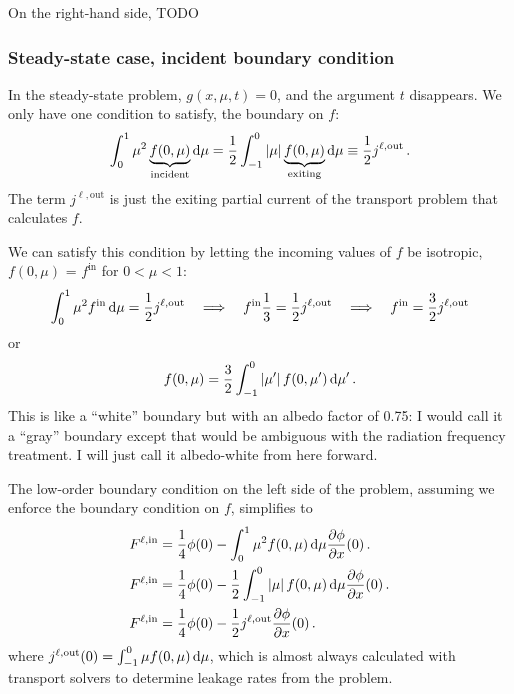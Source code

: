 On the right-hand side, TODO

\subsubsection{Steady-state case, incident boundary condition}
In the steady-state problem, $g(x, \mu, t)=0$, and the argument $t$
disappears.
We only have one condition to satisfy, the boundary on $f$:
\begin{equation*}
  \int_{0}^{1} \mu^2 \underbrace{f(0, \mu)}_{\text{incident}} \mathop{}\!\mathrm{d}\mu
  = \frac{1}{2} \int_{-1}^{0} \left| \mu \right| 
  \underbrace{f(0, \mu) }_{\text{exiting}} \mathop{}\!\mathrm{d}\mu
  \equiv \frac{1}{2} j^{\ell,\mathrm{out}}\,.
\end{equation*}
The term $j^{\ell,\mathrm{out}}$ is just the exiting partial current of the
transport problem that calculates $f$.

We can satisfy this condition by letting the incoming values of $f$ be
isotropic, $f(0, \mu)$ = $f^\mathrm{in}$ for $0 < \mu < 1$:
\begin{align*}
  \int_{0}^{1} \mu^2 f^\mathrm{in}\mathop{}\!\mathrm{d} \mu
  = \frac{1}{2} j^{\ell,\mathrm{out}}
  \quad \Longrightarrow \quad
  f^\mathrm{in} \frac{1}{3}
  = \frac{1}{2} j^{\ell,\mathrm{out}}
  \quad \Longrightarrow \quad
  f^\mathrm{in} = \frac{3}{2} j^{\ell,\mathrm{out}}
\end{align*}
or
\begin{equation} \label{eq:bndyFOnedIncident}
  f(0, \mu) = \frac{3}{2} \int_{-1}^{0} \left| \mu' \right| f(0, \mu') \mathop{}\!\mathrm{d}\mu' \,.
\end{equation}
This is like a ``white'' boundary but with an albedo factor of 0.75: I would
call it a ``gray'' boundary except that would be ambiguous with the
radiation frequency treatment. I will just call it albedo-white from here
forward.

The low-order boundary condition on the left side of the problem, assuming we
enforce the boundary condition on $f$, simplifies to
\begin{align} \nonumber
  F^{\ell,\mathrm{in}}
  &= \frac{1}{4} \phi(0)
  - \int_{0}^{1} \mu^2 f(0, \mu) \mathop{}\!\mathrm{d} \mu \frac{\partial \phi}{\partial x}(0) \,.
  \\ \nonumber
  F^{\ell,\mathrm{in}}
  &= \frac{1}{4} \phi(0)
  - \frac{1}{2} \int_{-1}^{0} \left| \mu \right| f(0, \mu) \mathop{}\!\mathrm{d}\mu \frac{\partial \phi}{\partial x}(0) \,.
  \\ \label{eq:bndyAnisotropicOnedSs}
  F^{\ell,\mathrm{in}}
  &= \frac{1}{4} \phi(0)
  - \frac{1}{2} j^{\ell,\mathrm{out}} \frac{\partial \phi}{\partial x}(0) \,.
\end{align}
where $j^\mathrm{\ell,out}(0) = \int_{-1}^{0} \mu f(0, \mu) \mathop{}\!\mathrm{d}\mu$, which
is almost always calculated with transport solvers to determine leakage rates
from the problem.

